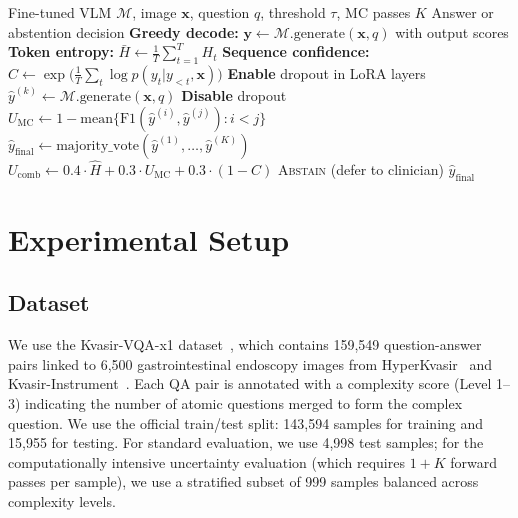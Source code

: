 \documentclass[pdflatex,sn-mathphys-num]{sn-jnl}
\begin{document}
\begin{algorithm}[t]
\caption{Uncertainty-Aware Inference}\label{alg:inference}
\begin{algorithmic}[1]
\Require Fine-tuned VLM $\mathcal{M}$, image $\mathbf{x}$, question $q$, threshold $\tau$, MC passes $K$
\Ensure Answer or abstention decision
\State \textbf{Greedy decode:} $\mathbf{y} \gets \mathcal{M}.\text{generate}(\mathbf{x}, q)$ with output scores
\State \textbf{Token entropy:} $\bar{H} \gets \frac{1}{T}\sum_{t=1}^{T} H_t$ 
\State \textbf{Sequence confidence:} $C \gets \exp\!\bigl(\frac{1}{T}\sum_{t} \log p(y_t | y_{<t}, \mathbf{x})\bigr)$ 
\State \textbf{Enable} dropout in LoRA layers
    \State $\hat{y}^{(k)} \gets \mathcal{M}.\text{generate}(\mathbf{x}, q)$ 
\EndFor
\State \textbf{Disable} dropout
\State $U_{\text{MC}} \gets 1 - \text{mean}\bigl\{\text{F1}(\hat{y}^{(i)}, \hat{y}^{(j)}) : i < j\bigr\}$ 
\State $\hat{y}_{\text{final}} \gets \text{majority\_vote}(\hat{y}^{(1)}, \ldots, \hat{y}^{(K)})$
\State $U_{\text{comb}} \gets 0.4 \cdot \hat{H} + 0.3 \cdot U_{\text{MC}} + 0.3 \cdot (1 - C)$ 
    \State \Return \textsc{Abstain} (defer to clinician)
\Else
    \State \Return $\hat{y}_{\text{final}}$
\EndIf
\end{algorithmic}
\end{algorithm}

\section{Experimental Setup}\label{sec:experiments}

\subsection{Dataset}

We use the Kvasir-VQA-x1 dataset~\cite{gautam2025kvasirx1}, which contains 159,549 question-answer pairs linked to 6,500 gastrointestinal endoscopy images from HyperKvasir~\cite{borgli2020hyperkvasir} and Kvasir-Instrument~\cite{jha2021kvasir_instrument}. Each QA pair is annotated with a complexity score (Level 1--3) indicating the number of atomic questions merged to form the complex question. We use the official train/test split: 143,594 samples for training and 15,955 for testing. For standard evaluation, we use 4,998 test samples; for the computationally intensive uncertainty evaluation (which requires $1 + K$ forward passes per sample), we use a stratified subset of 999 samples balanced across complexity levels.
\end{document}
